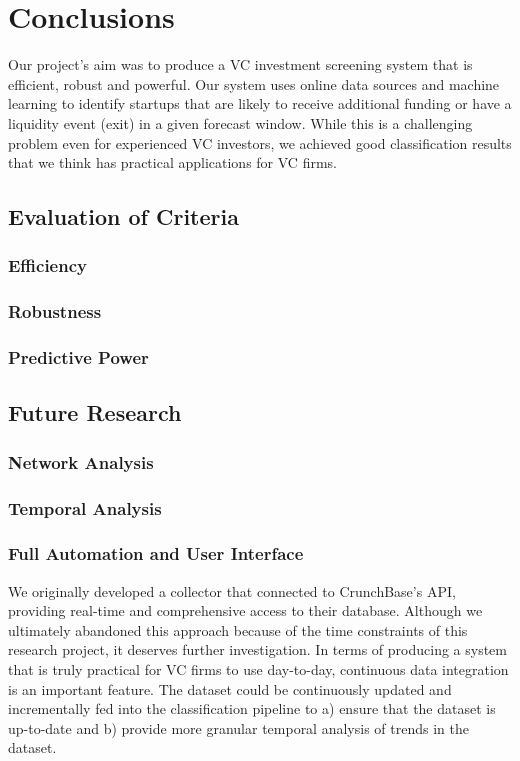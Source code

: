 \documentclass[../thesis/thesis.tex]{subfiles}
\begin{document}
 \chapter{Conclusions}

Our project’s aim was to produce a VC investment screening system that is efficient, robust and powerful. Our system uses online data sources and machine learning to identify startups that are likely to receive additional funding or have a liquidity event (exit) in a given forecast window. While this is a challenging problem even for experienced VC investors, we achieved good classification results that we think has practical applications for VC firms.

\section{Evaluation of Criteria}

\subsection{Efficiency}


\subsection{Robustness}


\subsection{Predictive Power}


\section{Future Research}

\subsection{Network Analysis}


\subsection{Temporal Analysis}


\subsection{Full Automation and User Interface}

We originally developed a collector that connected to CrunchBase’s API, providing real-time and comprehensive access to their database. Although we ultimately abandoned this approach because of the time constraints of this research project, it deserves further investigation. In terms of producing a system that is truly practical for VC firms to use day-to-day, continuous data integration is an important feature.  The dataset could be continuously updated and incrementally fed into the classification pipeline to a) ensure that the dataset is up-to-date and b) provide more granular temporal analysis of trends in the dataset.
\end{document}
